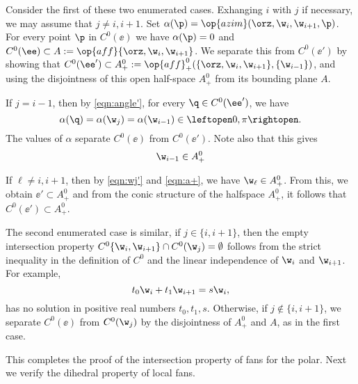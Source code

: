 Consider the first of these two enumerated 
cases.  Exhanging $i$ with $j$ if necessary,
we may assume that $j\ne i,i+1$.  
Set $\alpha(\p)=\op{azim}(\orz,\w_i,\w_{i+1},\p)$.  For every point
$\p$ in $C^0(\ee)$ we have
$\alpha(\p)=0$ and
$C^0(\ee)\subset A:= \op{aff}\{\orz,\w_i,\w_{i+1}\}$.
We separate this from $C^0(\ee')$ by showing that
$C^0(\ee')\subset A_+^0:= \op{aff}_+^0(\{\orz,\w_i,\w_{i+1}\},\{\w_{i-1}\})$,
and using the disjointness of this open half-space $A_+^0$ from its bounding
plane $A$.

 If $j=i-1$, then by \eqref{eqn:angle'}, for every $\q\in C^0(\ee')$, 
we have 
\[
\alpha(\q)=\alpha(\w_j) = \alpha(\w_{i-1}) \in\leftopen 0,\pi\rightopen.
\]
The values of $\alpha$ separate $C^0(\ee)$ from $C^0(\ee')$.  Note also
that this gives 
\begin{equation}\label{eqn:a+}
\w_{i-1}\in A_+^0
\end{equation}

If $\ell\ne i,i+1$, then by \eqref{eqn:wj'} and \eqref{eqn:a+}, we have
$\w_\ell\in A_+^0$.  From this, we obtain $\ee'\subset A_+^0$ and from
the conic structure of the halfspace $A_+^0$, it follows that $C^0(\ee')\subset A_+^0$.


The second enumerated case is similar,  if $j\in\{i,i+1\}$, then the empty
intersection property $C^0\{\w_i,\w_{i+1}\}\cap C^0(\w_j)=\emptyset$
follows from the strict inequality in the definition of $C^0$ and the
linear independence of $\w_i$ and $\w_{i+1}$.  For example,
\[
t_0 \w_i + t_1 \w_{i+1} = s \w_i,
\]
has no solution in positive real numbers $t_0,t_1,s$.
Otherwise, if $j\not\in\{i,i+1\}$,
we separate $C^0(\ee)$ from $C^0(\w_j)$ by the disjointness of $A_+^0$ and $A$, 
as in the first case.

This completes the proof of the intersection property of fans for the polar.
Next we verify the dihedral property of local fans. 


